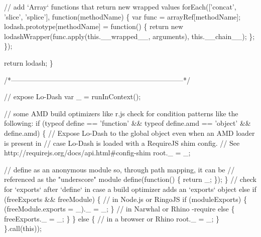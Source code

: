 \begin{DoxyCodeInclude}
    \textcolor{comment}{// add `Array` functions that return new wrapped values}
    forEach([\textcolor{stringliteral}{'concat'}, \textcolor{stringliteral}{'slice'}, \textcolor{stringliteral}{'splice'}], \textcolor{keyword}{function}(methodName) \{
      var func = arrayRef[methodName];
      lodash.prototype[methodName] = \textcolor{keyword}{function}() \{
        \textcolor{keywordflow}{return} \textcolor{keyword}{new} lodashWrapper(func.apply(\textcolor{keyword}{this}.\_\_wrapped\_\_, arguments), this.\_\_chain\_\_);
      \};
    \});

    \textcolor{keywordflow}{return} lodash;
  \}

  \textcolor{comment}{/*--------------------------------------------------------------------------*/}

  \textcolor{comment}{// expose Lo-Dash}
  var \_ = runInContext();

  \textcolor{comment}{// some AMD build optimizers like r.js check for condition patterns like the following:}
  \textcolor{keywordflow}{if} (typeof define == \textcolor{stringliteral}{'function'} && typeof define.amd == \textcolor{stringliteral}{'object'} && define.amd) \{
    \textcolor{comment}{// Expose Lo-Dash to the global object even when an AMD loader is present in}
    \textcolor{comment}{// case Lo-Dash is loaded with a RequireJS shim config.}
    \textcolor{comment}{// See http://requirejs.org/docs/api.html#config-shim}
    root.\_ = \_;

    \textcolor{comment}{// define as an anonymous module so, through path mapping, it can be}
    \textcolor{comment}{// referenced as the "underscore" module}
    define(\textcolor{keyword}{function}() \{
      \textcolor{keywordflow}{return} \_;
    \});
  \}
  \textcolor{comment}{// check for `exports` after `define` in case a build optimizer adds an `exports` object}
  \textcolor{keywordflow}{else} \textcolor{keywordflow}{if} (freeExports && freeModule) \{
    \textcolor{comment}{// in Node.js or RingoJS}
    \textcolor{keywordflow}{if} (moduleExports) \{
      (freeModule.exports = \_).\_ = \_;
    \}
    \textcolor{comment}{// in Narwhal or Rhino -require}
    \textcolor{keywordflow}{else} \{
      freeExports.\_ = \_;
    \}
  \}
  \textcolor{keywordflow}{else} \{
    \textcolor{comment}{// in a browser or Rhino}
    root.\_ = \_;
  \}
\}.call(\textcolor{keyword}{this}));
\end{DoxyCodeInclude}
 